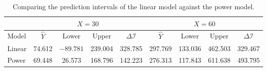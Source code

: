 \documentclass[10pt]{article}
\begin{document}
\begin{itemize}
    \begin{table}[ht]
        \def\arraystretch{1.25}
        \centering
        \begin{tabular}{|l|cccc|cccc|}
            \hline%
            &\multicolumn{4}{|c|}{\(X = 30\)} & \multicolumn{4}{|c|}{\(X = 60\)}\\
            \hline%
            Model & \(\hat{Y}\) & Lower & Upper & \(\Delta\mathcal{I}\) & \(\hat{Y}\) & Lower & Upper & \(\Delta\mathcal{I}\)\\
            \hline%
            Linear & 74.612 & \(-89.781\) & 239.004 & 328.785 & 297.769 & 133.036 & 462.503 & 329.467 \\
            Power  & 69.448 & 26.573      & 168.796 & 142.223 & 276.313 & 117.843 & 611.638 & 493.795 \\
            \hline%
        \end{tabular}
        \caption{Comparing the prediction intervals of the linear model against the power model.}
        \label{q01-prediction-intervals}
    \end{table}
\end{itemize}

\newcommand{\gmat}{\mathbf{G}_{\bm{\lambda}}}
\newcommand{\myga}{\mathbf{g}_{\theta}}
\newcommand{\mygp}[1]{\mathbf{g}_{\lambda}(#1)}
\newcommand{\mygap}[1]{\mathbf{g}_{\theta}(#1)}
\end{document}
